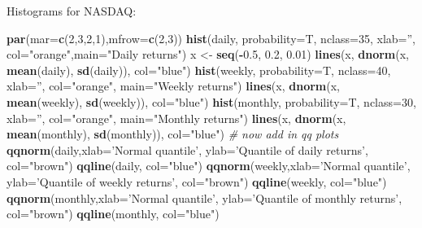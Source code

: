 \documentclass[11pt,]{article}
\newenvironment{Shaded}{\begin{snugshade}}{\end{snugshade}}
\newcommand{\CommentTok}[1]{\textcolor[rgb]{0.56,0.35,0.01}{\textit{#1}}}
\newcommand{\DataTypeTok}[1]{\textcolor[rgb]{0.13,0.29,0.53}{#1}}
\newcommand{\DecValTok}[1]{\textcolor[rgb]{0.00,0.00,0.81}{#1}}
\newcommand{\FloatTok}[1]{\textcolor[rgb]{0.00,0.00,0.81}{#1}}
\newcommand{\KeywordTok}[1]{\textcolor[rgb]{0.13,0.29,0.53}{\textbf{#1}}}
\newcommand{\NormalTok}[1]{#1}
\newcommand{\OperatorTok}[1]{\textcolor[rgb]{0.81,0.36,0.00}{\textbf{#1}}}
\newcommand{\StringTok}[1]{\textcolor[rgb]{0.31,0.60,0.02}{#1}}
\begin{document}
Histograms for NASDAQ:

\begin{Shaded}
\begin{Highlighting}[]
\KeywordTok{par}\NormalTok{(}\DataTypeTok{mar=}\KeywordTok{c}\NormalTok{(}\DecValTok{2}\NormalTok{,}\DecValTok{3}\NormalTok{,}\DecValTok{2}\NormalTok{,}\DecValTok{1}\NormalTok{),}\DataTypeTok{mfrow=}\KeywordTok{c}\NormalTok{(}\DecValTok{2}\NormalTok{,}\DecValTok{3}\NormalTok{))}
\KeywordTok{hist}\NormalTok{(daily, }\DataTypeTok{probability=}\NormalTok{T, }\DataTypeTok{nclass=}\DecValTok{35}\NormalTok{, }\DataTypeTok{xlab=}\StringTok{''}\NormalTok{,}
\DataTypeTok{col=}\StringTok{"orange"}\NormalTok{,}\DataTypeTok{main=}\StringTok{"Daily returns"}\NormalTok{)}
\NormalTok{x <-}\StringTok{ }\KeywordTok{seq}\NormalTok{(}\OperatorTok{-}\FloatTok{0.5}\NormalTok{, }\FloatTok{0.2}\NormalTok{, }\FloatTok{0.01}\NormalTok{)}
\KeywordTok{lines}\NormalTok{(x, }\KeywordTok{dnorm}\NormalTok{(x, }\KeywordTok{mean}\NormalTok{(daily), }\KeywordTok{sd}\NormalTok{(daily)), }\DataTypeTok{col=}\StringTok{"blue"}\NormalTok{)}
\KeywordTok{hist}\NormalTok{(weekly, }\DataTypeTok{probability=}\NormalTok{T, }\DataTypeTok{nclass=}\DecValTok{40}\NormalTok{, }\DataTypeTok{xlab=}\StringTok{''}\NormalTok{, }\DataTypeTok{col=}\StringTok{"orange"}\NormalTok{,}
\DataTypeTok{main=}\StringTok{"Weekly returns"}\NormalTok{)}
\KeywordTok{lines}\NormalTok{(x, }\KeywordTok{dnorm}\NormalTok{(x, }\KeywordTok{mean}\NormalTok{(weekly), }\KeywordTok{sd}\NormalTok{(weekly)), }\DataTypeTok{col=}\StringTok{"blue"}\NormalTok{)}
\KeywordTok{hist}\NormalTok{(monthly, }\DataTypeTok{probability=}\NormalTok{T, }\DataTypeTok{nclass=}\DecValTok{30}\NormalTok{, }\DataTypeTok{xlab=}\StringTok{''}\NormalTok{, }\DataTypeTok{col=}\StringTok{"orange"}\NormalTok{, }\DataTypeTok{main=}\StringTok{"Monthly returns"}\NormalTok{)}
\KeywordTok{lines}\NormalTok{(x, }\KeywordTok{dnorm}\NormalTok{(x, }\KeywordTok{mean}\NormalTok{(monthly), }\KeywordTok{sd}\NormalTok{(monthly)), }\DataTypeTok{col=}\StringTok{"blue"}\NormalTok{)}
\CommentTok{# now add in qq plots}
\KeywordTok{qqnorm}\NormalTok{(daily,}\DataTypeTok{xlab=}\StringTok{'Normal quantile'}\NormalTok{, }\DataTypeTok{ylab=}\StringTok{'Quantile of daily returns'}\NormalTok{,}
\DataTypeTok{col=}\StringTok{"brown"}\NormalTok{)}
\KeywordTok{qqline}\NormalTok{(daily, }\DataTypeTok{col=}\StringTok{"blue"}\NormalTok{)}
\KeywordTok{qqnorm}\NormalTok{(weekly,}\DataTypeTok{xlab=}\StringTok{'Normal quantile'}\NormalTok{, }\DataTypeTok{ylab=}\StringTok{'Quantile of weekly returns'}\NormalTok{,}
\DataTypeTok{col=}\StringTok{"brown"}\NormalTok{)}
\KeywordTok{qqline}\NormalTok{(weekly, }\DataTypeTok{col=}\StringTok{"blue"}\NormalTok{)}
\KeywordTok{qqnorm}\NormalTok{(monthly,}\DataTypeTok{xlab=}\StringTok{'Normal quantile'}\NormalTok{, }\DataTypeTok{ylab=}\StringTok{'Quantile of monthly returns'}\NormalTok{,}
\DataTypeTok{col=}\StringTok{"brown"}\NormalTok{)}
\KeywordTok{qqline}\NormalTok{(monthly, }\DataTypeTok{col=}\StringTok{"blue"}\NormalTok{)}
\end{Highlighting}
\end{Shaded}
\end{document}
